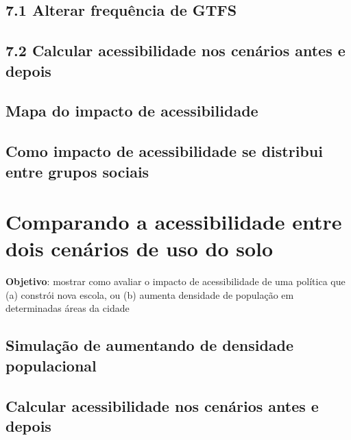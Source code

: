 \documentclass[
  letterpaper,
  DIV=11,
  numbers=noendperiod]{scrreprt}
\begin{document}
\hypertarget{alterar-frequuxeancia-de-gtfs}{%
\section{7.1 Alterar frequência de
GTFS}\label{alterar-frequuxeancia-de-gtfs}}

\hypertarget{calcular-acessibilidade-nos-cenuxe1rios-antes-e-depois}{%
\section{7.2 Calcular acessibilidade nos cenários antes e
depois}\label{calcular-acessibilidade-nos-cenuxe1rios-antes-e-depois}}

\hypertarget{mapa-do-impacto-de-acessibilidade}{%
\section{Mapa do impacto de
acessibilidade}\label{mapa-do-impacto-de-acessibilidade}}

\hypertarget{como-impacto-de-acessibilidade-se-distribui-entre-grupos-sociais}{%
\section{Como impacto de acessibilidade se distribui entre grupos
sociais}\label{como-impacto-de-acessibilidade-se-distribui-entre-grupos-sociais}}

\hypertarget{comparando-a-acessibilidade-entre-dois-cenuxe1rios-de-uso-do-solo}{%
\chapter{Comparando a acessibilidade entre dois cenários de uso do
solo}\label{comparando-a-acessibilidade-entre-dois-cenuxe1rios-de-uso-do-solo}}

\textbf{Objetivo}: mostrar como avaliar o impacto de acessibilidade de
uma política que (a) constrói nova escola, ou (b) aumenta densidade de
população em determinadas áreas da cidade

\hypertarget{simulauxe7uxe3o-de-aumentando-de-densidade-populacional}{%
\section{Simulação de aumentando de densidade
populacional}\label{simulauxe7uxe3o-de-aumentando-de-densidade-populacional}}

\hypertarget{calcular-acessibilidade-nos-cenuxe1rios-antes-e-depois-1}{%
\section{Calcular acessibilidade nos cenários antes e
depois}\label{calcular-acessibilidade-nos-cenuxe1rios-antes-e-depois-1}}
\end{document}
